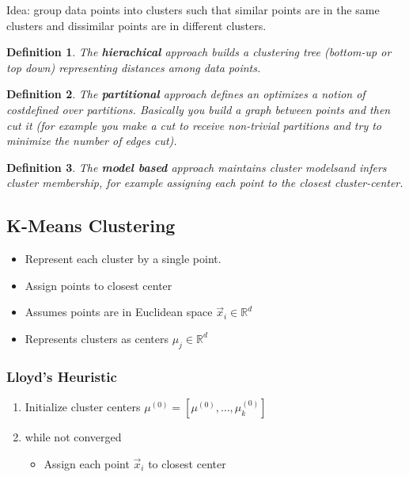 \documentclass[10pt,a4paper]{scrartcl}
\newtheorem{define}{Definition}
\begin{document}
\begin{multicols*}{2}
Idea: group data points into clusters such that similar points are in the same clusters and dissimilar points are in different clusters.

\begin{define}
The \textbf{hierachical} approach builds a clustering tree (bottom-up or top down) representing distances among data points.
\end{define}

\begin{define}
The \textbf{partitional} approach defines an optimizes a notion of \glqq cost\grqq defined over partitions. Basically you build a graph between points and then cut it (for example you make a cut to receive non-trivial partitions and try to minimize the number of edges cut).
\end{define}

\begin{define}
The \textbf{model based} approach maintains cluster \glqq models\grqq and infers cluster membership, for example assigning each point to the closest cluster-center.
\end{define}

\subsection{K-Means Clustering}

\begin{itemize}
\item Represent each cluster by a single point.
\item Assign points to closest center
\item Assumes points are in Euclidean space $\vec{x}_i\in\mathbb{R}^d$
\item Represents clusters as centers $\mu_j\in\mathbb{R}^d$
\end{itemize}


\subsubsection{Lloyd's Heuristic}

\begin{enumerate}
\item Initialize cluster centers $\mu^{(0)}=[\mu^{(0)},\ldots,\mu_k^{(0)}]$
\item while not converged
\begin{itemize}
\item Assign each point $\vec{x}_i$ to closest center


\end{itemize}
\end{enumerate}
\end{multicols*}
\end{document}
